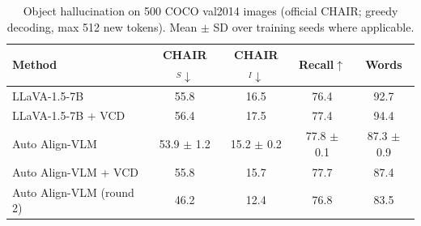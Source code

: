 \begin{table}[t]
\centering
\small
\caption{Object hallucination on 500 COCO val2014 images (official CHAIR; greedy decoding, max 512 new tokens). Mean $\pm$ SD over training seeds where applicable.}
\label{tab:chair}
\begin{tabular}{lcccc}
\toprule
Method & CHAIR$_S\downarrow$ & CHAIR$_I\downarrow$ & Recall$\uparrow$ & Words \\
\midrule
LLaVA-1.5-7B & 55.8 & 16.5 & 76.4 & 92.7 \\
LLaVA-1.5-7B + VCD & 56.4 & 17.5 & 77.4 & 94.4 \\
Auto Align-VLM & 53.9 $\pm$ 1.2 & 15.2 $\pm$ 0.2 & 77.8 $\pm$ 0.1 & 87.3 $\pm$ 0.9 \\
Auto Align-VLM + VCD & 55.8 & 15.7 & 77.7 & 87.4 \\
Auto Align-VLM (round 2) & 46.2 & 12.4 & 76.8 & 83.5 \\
\bottomrule
\end{tabular}
\end{table}
